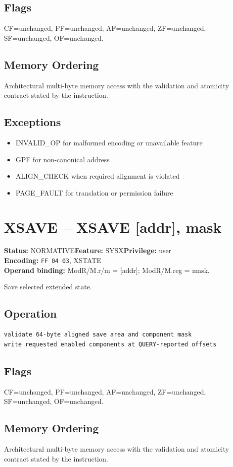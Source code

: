 \documentclass[10pt]{article}
\begin{document}
\subsection*{Flags}
CF=unchanged, PF=unchanged, AF=unchanged, ZF=unchanged, SF=unchanged, OF=unchanged.
\subsection*{Memory Ordering}
Architectural multi-byte memory access with the validation and atomicity contract stated by the instruction.
\subsection*{Exceptions}
\begin{itemize}
\item INVALID\_OP for malformed encoding or unavailable feature
\item GPF for non-canonical address
\item ALIGN\_CHECK when required alignment is violated
\item PAGE\_FAULT for translation or permission failure
\end{itemize}
\clearpage

\section{XSAVE -- XSAVE [addr], mask}
\textbf{Status:} NORMATIVE\quad \textbf{Feature:} SYSX\quad \textbf{Privilege:} user\\
\textbf{Encoding:} \texttt{FF 04 03}, XSTATE\\
\textbf{Operand binding:} ModR/M.r/m = [addr]; ModR/M.reg = mask.

Save selected extended state.

\subsection*{Operation}
\begin{lstlisting}
validate 64-byte aligned save area and component mask
write requested enabled components at QUERY-reported offsets
\end{lstlisting}
\subsection*{Flags}
CF=unchanged, PF=unchanged, AF=unchanged, ZF=unchanged, SF=unchanged, OF=unchanged.
\subsection*{Memory Ordering}
Architectural multi-byte memory access with the validation and atomicity contract stated by the instruction.
\end{document}
